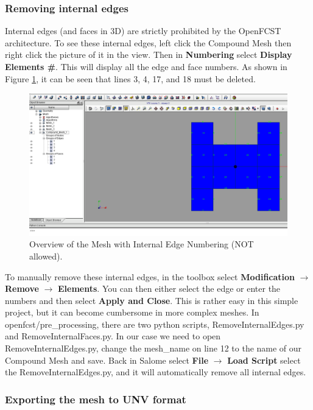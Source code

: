 \subsubsection{Removing internal edges}

Internal edges (and faces in 3D) are strictly prohibited by the OpenFCST architecture.  To see these internal edges, left click the Compound Mesh then right click the picture of it in the view. Then in \textbf{Numbering} select \textbf{Display Elements \#}. This will display all the edge and face numbers. As shown in Figure \ref{fig:no3.2.1.18}, it can be seen that lines 3, 4, 17, and 18 must be deleted. 
  
\begin{figure}[h]
\begin{center}
\includegraphics[scale=0.40]{figures/SalomeStep7.png}
\caption{Overview of the Mesh with Internal Edge Numbering (NOT allowed).}
\label{fig:no3.2.1.18}
\end{center}
\end{figure}
  
To manually remove these internal edges, in the toolbox select \textbf{Modification} $\rightarrow$ \textbf{Remove} $\rightarrow$ \textbf{Elements}. You can then either select the edge or enter the numbers and then select \textbf{Apply and Close}. This is rather easy in this simple project, but it can become cumbersome in more complex meshes. In openfcst/pre\_processing, there are two python scripts, RemoveInternalEdges.py and RemoveInternalFaces.py. In our case we need to open RemoveInternalEdges.py, change the mesh\_name on line 12 to the name of our Compound Mesh and save. Back in Salome select \textbf{File} $\rightarrow$ \textbf{Load Script} select the RemoveInternalEdges.py, and it will automatically remove all internal edges.
  
\subsubsection{Exporting the mesh to UNV format}


